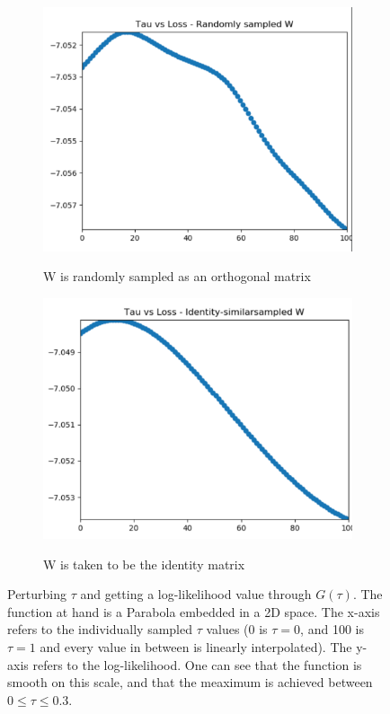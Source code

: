 \begin{figure}[H]
    \centering
    \begin{subfigure}[b]{0.40\textwidth}
        \includegraphics[width=\textwidth]{Appendix1/tau_0}
        \label{fig:gull}
        \caption{W is randomly sampled as an orthogonal matrix}
    \end{subfigure}
    \quad
    \begin{subfigure}[b]{0.40\textwidth}
        \includegraphics[width=\textwidth]{Appendix1/tau_1}
        \label{fig:tiger}
        \caption{W is taken to be the identity matrix}
    \end{subfigure}   
           \caption{Perturbing $\tau$ and getting a log-likelihood value through $G(\tau)$.
           The function at hand is a Parabola embedded in a 2D space.
           The x-axis refers to the individually sampled $\tau$ values (0 is $\tau = 0$, and 100 is $\tau = 1$ and every value in between is linearly interpolated).
           The y-axis refers to the log-likelihood.
           One can see that the function is smooth on this scale, and that the meaximum is achieved between $0 \leq \tau \leq 0.3 $. }
\end{figure}
